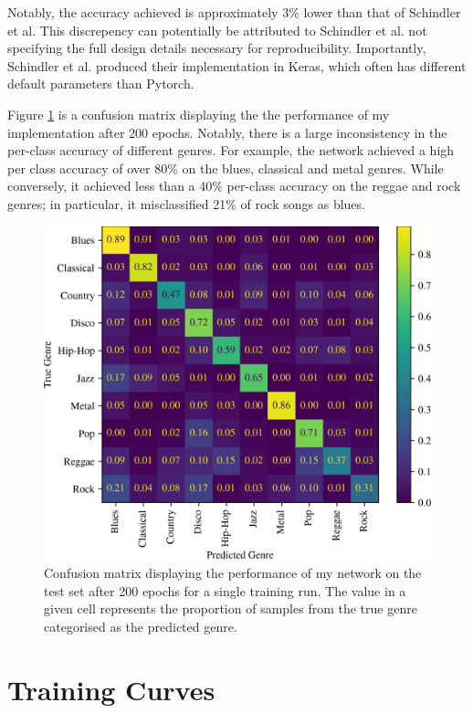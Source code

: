 \documentclass[conference]{IEEEtran}
\begin{document}
Notably, the accuracy achieved is approximately 3\% lower than that of Schindler et al.
This discrepency can potentially be attributed to Schindler et al. not specifying the full design details necessary for reproducibility.
Importantly, Schindler et al. produced their implementation in Keras, which often has different default parameters than Pytorch.

Figure \ref{confusion_matrix} is a confusion matrix displaying the the performance of my implementation after 200 epochs.
Notably, there is a large inconsistency in the per-class accuracy of different genres.
For example, the network achieved a high per class accuracy of over 80\% on the blues, classical and metal genres.
While conversely, it achieved less than a 40\% per-class accuracy on the reggae and rock genres; in particular, it misclassified 21\% of rock songs as blues.

\begin{figure}[htbp]
    \centerline{\includegraphics[width=\columnwidth]{cm.png}}
    \caption{
        Confusion matrix displaying the performance of my network on the test set after 200 epochs for a single training run.    
        The value in a given cell represents the proportion of samples from the true genre categorised as the predicted genre.
    }
    \label{confusion_matrix}
\end{figure}

\section{Training Curves}
\end{document}
